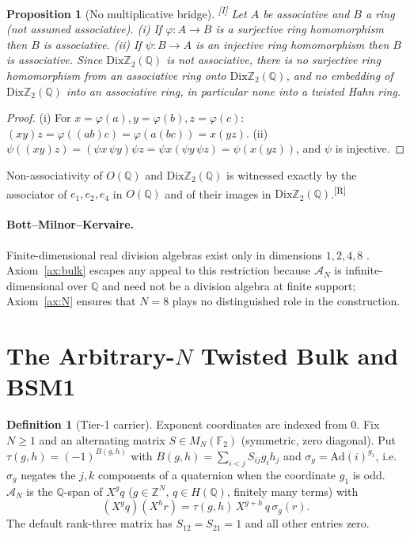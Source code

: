 \documentclass[11pt,a4paper]{article}
\newtheorem{proposition}[theorem]{Proposition}
\theoremstyle{definition}
\newtheorem{definition}[theorem]{Definition}
\theoremstyle{remark}
\newcommand{\Q}{\mathbb{Q}}
\newcommand{\Z}{\mathbb{Z}}
\newcommand{\F}{\mathbb{F}}
\newcommand{\HQ}{H(\mathbb{Q})}
\newcommand{\OQ}{O(\mathbb{Q})}
\newcommand{\DZ}{\mathrm{Dix}\mathbb{Z}_2(\mathbb{Q})}
\newcommand{\tR}{\textsuperscript{[R]}}
\newcommand{\tI}{\textsuperscript{[I]}}
\begin{document}
\begin{proposition}[No multiplicative bridge]\label{prop:nohom}\tI
Let $A$ be associative and $B$ a ring (not assumed associative). (i) If $\varphi:A\to B$ is a surjective ring homomorphism then $B$ is associative. (ii) If $\psi:B\to A$ is an injective ring homomorphism then $B$ is associative. Since $\DZ$ is not associative, there is no surjective ring homomorphism from an associative ring onto $\DZ$, and no embedding of $\DZ$ into an associative ring, in particular none into a twisted Hahn ring.
\end{proposition}
\begin{proof}
(i) For $x=\varphi(a),y=\varphi(b),z=\varphi(c)$: $(xy)z=\varphi((ab)c)=\varphi(a(bc))=x(yz)$. (ii) $\psi((xy)z)=(\psi x\,\psi y)\psi z=\psi x(\psi y\,\psi z)=\psi(x(yz))$, and $\psi$ is injective.
\end{proof}
\noindent Non-associativity of $\OQ$ and $\DZ$ is witnessed exactly by the associator of $e_1,e_2,e_4$ in $\OQ$ and of their images in $\DZ$.\tR

\paragraph{Bott--Milnor--Kervaire.} Finite-dimensional real division algebras exist only in dimensions $1,2,4,8$ \cite{BottMilnor,Kervaire}. Axiom~\ref{ax:bulk} escapes any appeal to this restriction because $\mathcal{A}_N$ is infinite-dimensional over $\Q$ and need not be a division algebra at finite support; Axiom~\ref{ax:N} ensures that $N=8$ plays no distinguished role in the construction.

\section{The Arbitrary-$N$ Twisted Bulk and BSM1}\label{sec:bulk}
\begin{definition}[Tier-1 carrier]\label{def:bulk}
Exponent coordinates are indexed from $0$. Fix $N\ge1$ and an alternating matrix $S\in M_N(\F_2)$ (symmetric, zero diagonal). Put $\tau(g,h)=(-1)^{B(g,h)}$ with $B(g,h)=\sum_{i<j}S_{ij}g_ih_j$ and $\sigma_g=\mathrm{Ad}(i)^{g_1}$, i.e.\ $\sigma_g$ negates the $j,k$ components of a quaternion when the coordinate $g_1$ is odd. $\mathcal{A}_N$ is the $\Q$-span of $X^g q$ ($g\in\Z^N$, $q\in\HQ$, finitely many terms) with
\begin{equation}
(X^gq)(X^hr)=\tau(g,h)\,X^{g+h}\,q\,\sigma_g(r).\label{eq:prod}
\end{equation}
The default rank-three matrix has $S_{12}=S_{21}=1$ and all other entries zero.
\end{definition}
\end{document}
